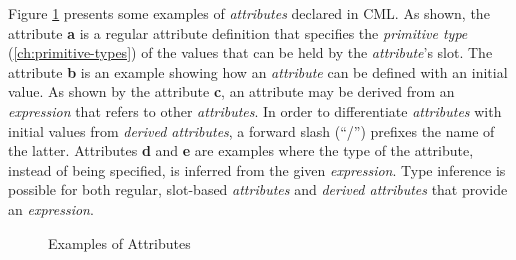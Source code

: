 Figure \ref{fig:ex:attributes} presents some examples of \emph{attributes} declared in CML.
As shown,
the attribute \textbf{a} is a regular attribute definition 
that specifies the \emph{primitive type} (\ref{ch:primitive-types})
of the values that can be held by the \emph{attribute}'s slot.
The attribute \textbf{b} is an example showing how an \emph{attribute}
can be defined with an initial value.
As shown by the attribute \textbf{c}, 
an attribute may be derived from an \emph{expression}
that refers to other \emph{attributes}.
In order to differentiate \emph{attributes} with initial values
from \emph{derived attributes},
a forward slash (``/'') prefixes the name of the latter.
Attributes \textbf{d} and \textbf{e} are examples
where the type of the attribute,
instead of being specified,
is inferred from the given \emph{expression}.
Type inference is possible for both regular, slot-based \emph{attributes}
and \emph{derived attributes} that provide an \emph{expression}.

\begin{figure}
\verbatimfont{\small}

\caption{Examples of Attributes}
\label{fig:ex:attributes}
\end{figure}
